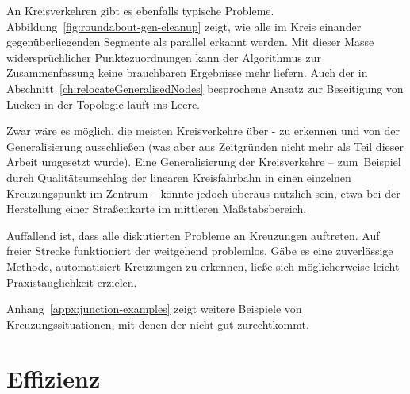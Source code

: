 \documentclass[../main/thesis.tex]{subfiles}
\begin{document}
An Kreisverkehren gibt es ebenfalls typische Probleme.
Abbildung~\ref{fig:roundabout-gen-cleanup} zeigt, wie alle im Kreis einander gegenüberliegenden Segmente als parallel erkannt werden.
Mit dieser Masse widersprüchlicher Punktezuordnungen kann der Algorithmus zur Zusammenfassung keine brauchbaren Ergebnisse mehr liefern.
Auch der in Abschnitt~\ref{ch:relocateGeneralisedNodes} besprochene Ansatz zur Beseitigung von Lücken in der Topologie läuft ins Leere.


Zwar wäre es möglich, die meisten Kreisverkehre über \osm- zu erkennen und von der Generalisierung ausschließen (was aber aus Zeitgründen nicht mehr als Teil dieser Arbeit umgesetzt wurde).
Eine Generalisierung der Kreisverkehre -- zum~Beispiel durch Qualitätsumschlag der linearen Kreisfahrbahn in einen einzelnen Kreuzungspunkt im Zentrum -- könnte jedoch überaus nützlich sein, etwa bei der Herstellung einer Straßenkarte im mittleren Maßstabsbereich.

\newpage
Auffallend ist, dass alle diskutierten Probleme an Kreuzungen auftreten.
Auf freier Strecke funktioniert der  weitgehend problemlos.
Gäbe es eine zuverlässige Methode, automatisiert Kreuzungen zu erkennen, ließe sich möglicherweise leicht Praxistauglichkeit erzielen.

Anhang~\ref{appx:junction-examples} zeigt weitere Beispiele von Kreuzungssituationen, mit denen der  nicht gut zurechtkommt.



\section{Effizienz}
\label{ch:efficiency}
\end{document}

